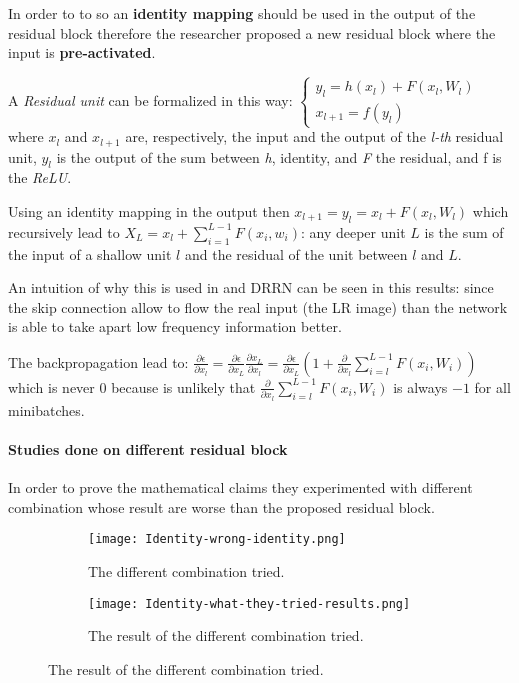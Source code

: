 In order to to so an \textbf{identity mapping} should be used in the output of the residual block therefore the researcher proposed a new residual block where the input is \textbf{pre-activated}.

A \textit{Residual unit} can be formalized in this way:
$
\begin{cases}
    y_l = h(x_l) + F(x_l,W_l) \\
    x_{l+1} = f(y_l)
\end{cases}
$ where $x_l$ and $x_{l+1}$ are, respectively, the input and the output of the \textit{l-th} residual unit, $y_l$ is the output of the sum between \textit{h}, identity, and \textit{F} the residual, and f is the \textit{ReLU}.

Using an identity mapping in the output then $x_{l+1} = y_l = x_l + F(x_l,W_l)$ which recursively lead to $X_L = x_l + \sum_{i=1}^{L-1} F(x_i,w_i)$: any deeper unit $L$ is the sum of the input of a shallow unit $l$ and the residual of the unit between $l$ and $L$.

An intuition of why this is used in  and DRRN\cite{DRRN} can be seen in this results: since the skip connection allow to flow the real input (the LR image) than the network is able to take apart low frequency information better.

The backpropagation lead to:
$\frac{\partial\epsilon}{\partial x_l} = \frac{\partial\epsilon}{\partial x_L} \frac{\partial x_L}{\partial x_l} = \frac{\partial\epsilon}{\partial x_L} \left(1 + \frac{\partial}{\partial x_l} \sum_{i=l}^{L-1} F(x_i,W_i)\right)$
which is never 0 because is unlikely that $ \frac{\partial}{\partial x_l} \sum_{i=l}^{L-1} F(x_i,W_i)$ is always $-1$ for all minibatches.

\paragraph{Studies done on different residual block}
In order to prove the mathematical claims they experimented with different combination whose result are worse than the proposed residual block.

\begin{figure}[H]
    \begin{subfigure}{\textwidth}
        \centering
        \texttt{[image: Identity-wrong-identity.png]}    
        \caption{The different combination tried.}
    \end{subfigure}
    \begin{subfigure}{\textwidth}
        \centering
        \texttt{[image: Identity-what-they-tried-results.png]}    
        \caption{The result of the different combination tried.}        
    \end{subfigure}
\end{figure}

